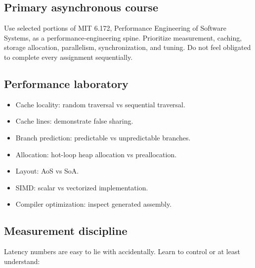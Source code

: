 \documentclass[11pt,letterpaper]{article}
\begin{document}
\subsection*{Primary asynchronous course}

Use selected portions of MIT 6.172, Performance Engineering of Software Systems, as a performance-engineering spine. Prioritize measurement, caching, storage allocation, parallelism, synchronization, and tuning. Do not feel obligated to complete every assignment sequentially.

\subsection*{Performance laboratory}

\begin{itemize}

\item Cache locality: random traversal vs sequential traversal.

\item Cache lines: demonstrate false sharing.

\item Branch prediction: predictable vs unpredictable branches.

\item Allocation: hot-loop heap allocation vs preallocation.

\item Layout: AoS vs SoA.

\item SIMD: scalar vs vectorized implementation.

\item Compiler optimization: inspect generated assembly.

\end{itemize}

\subsection*{Measurement discipline}

Latency numbers are easy to lie with accidentally. Learn to control or at least understand:
\end{document}
